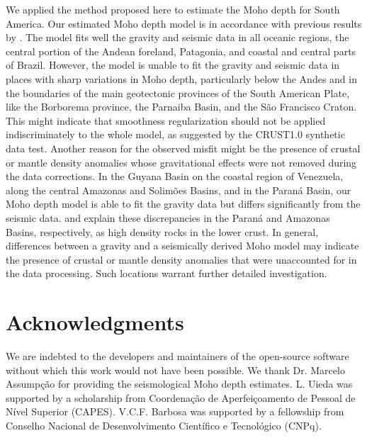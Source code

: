 \documentclass[extra,mreferee]{gji}
\begin{document}
We applied the method proposed here to estimate the Moho depth for South
America.
Our estimated Moho depth model is in accordance with previous results by
\citet{vandermeijde2013}.
The model fits well the gravity and seismic data in all oceanic regions, the
central portion of the Andean foreland, Patagonia, and coastal and central
parts of Brazil.
However, the model is unable to fit the gravity and seismic data in places with
sharp variations in Moho depth, particularly below the Andes and in the
boundaries of the main geotectonic provinces of the South American Plate, like
the Borborema province, the Parnaiba Basin, and the São Francisco Craton.
This might indicate that smoothness regularization should not be applied
indiscriminately to the whole model, as suggested by the CRUST1.0 synthetic
data test.
Another reason for the observed misfit might be the presence of crustal or
mantle density anomalies whose gravitational effects were not removed during
the data corrections.
In the Guyana Basin on the coastal region of Venezuela, along the central
Amazonas and Solimões Basins, and in the Paraná Basin, our Moho depth model is
able to fit the gravity data but differs significantly from the seismic data.
\citet{mariani2013} and \citet{nunn1988} explain these discrepancies in the
Paraná and Amazonas Basins, respectively, as high density rocks in the lower
crust.
In general, differences between a gravity and a seismically derived Moho model
may indicate the presence of crustal or mantle density anomalies that were
unaccounted for in the data processing.
Such locations warrant further detailed investigation.



\section{Acknowledgments}

We are indebted to the developers and maintainers of the open-source
software without which this work would not have been possible.
We thank Dr. Marcelo Assumpção for providing the seismological Moho depth
estimates.
L. Uieda was supported by a scholarship from
Coordenação de Aperfeiçoamento de Pessoal de Nível Superior
(CAPES).
V.C.F. Barbosa was supported by a fellowship from
Conselho Nacional de Desenvolvimento Científico e Tecnológico (CNPq).




\end{document}
